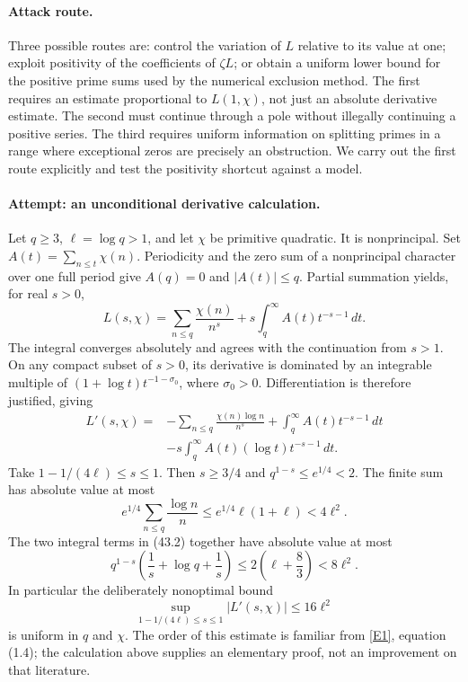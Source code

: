 \documentclass[11pt,a4paper]{article}
\newcommand{\eref}[2]{\hyperlink{extra:#1:#2}{[E#2]}}
\numberwithin{equation}{section}
\begin{document}
\paragraph{Attack route.}
Three possible routes are: control the variation of $L$ relative to its
value at one; exploit positivity of the coefficients of $\zeta L$; or
obtain a uniform lower bound for the positive prime sums used by the
numerical exclusion method. The first requires an estimate proportional
to $L(1,\chi)$, not just an absolute derivative estimate. The second must
continue through a pole without illegally continuing a positive series.
The third requires uniform information on splitting primes in a range
where exceptional zeros are precisely an obstruction. We carry out the
first route explicitly and test the positivity shortcut against a model.

\paragraph{Attempt: an unconditional derivative calculation.}
Let $q\ge3$, $\ell=\log q>1$, and let $\chi$ be primitive quadratic.
It is nonprincipal. Set $A(t)=\sum_{n\le t}\chi(n)$. Periodicity and the
zero sum of a nonprincipal character over one full period give
$A(q)=0$ and $|A(t)|\le q$. Partial summation yields, for real $s>0$,
\[
 L(s,\chi)=\sum_{n\le q}\frac{\chi(n)}{n^s}
               +s\int_q^\infty A(t)t^{-s-1}\,dt. \tag{43.1}
\]
The integral converges absolutely and agrees with the continuation from
$s>1$. On any compact subset of $s>0$, its derivative is dominated by an
integrable multiple of $(1+\log t)t^{-1-\sigma_0}$, where
$\sigma_0>0$. Differentiation is therefore justified, giving
\begin{align*}
 L'(s,\chi)={}&-\sum_{n\le q}\frac{\chi(n)\log n}{n^s}
       +\int_q^\infty A(t)t^{-s-1}\,dt\\
       &-s\int_q^\infty A(t)(\log t)t^{-s-1}\,dt. \tag{43.2}
\end{align*}
Take $1-1/(4\ell)\le s\le1$. Then $s\ge3/4$ and
$q^{1-s}\le e^{1/4}<2$. The finite sum has absolute value at most
\[
 e^{1/4}\sum_{n\le q}\frac{\log n}{n}
 \le e^{1/4}\ell(1+\ell)<4\ell^2.
\]
The two integral terms in (43.2) together have absolute value at most
\[
 q^{1-s}\left(\frac1s+\log q+\frac1s\right)
 \le2\left(\ell+\frac83\right)<8\ell^2.
\]
In particular the deliberately nonoptimal bound
\[
 \sup_{1-1/(4\ell)\le s\le1}|L'(s,\chi)|\le16\ell^2 \tag{43.3}
\]
is uniform in $q$ and $\chi$. The order of this estimate is familiar from
\eref{statement}{1}, equation (1.4); the calculation above supplies an elementary
proof, not an improvement on that literature.
\end{document}
